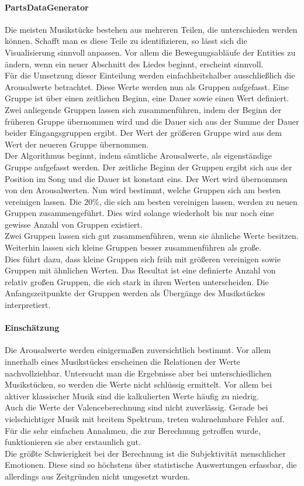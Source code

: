 \documentclass[11pt,a4paper]{article}
\begin{document}
\paragraph{PartsDataGenerator}
Die meisten Musikstücke bestehen aus mehreren Teilen, die unterschieden werden können. Schafft man es diese Teile zu identifizieren, so lässt sich die Visualisierung sinnvoll anpassen. Vor allem die Bewegungsabläufe der Entities zu ändern, wenn ein neuer Abschnitt des Liedes beginnt, erscheint sinnvoll.\\
Für die Umsetzung dieser Einteilung werden einfachheitshalber ausschließlich die Arousalwerte betrachtet. Diese Werte werden nun als Gruppen aufgefasst. Eine Gruppe ist über einen zeitlichen Beginn, eine Dauer sowie einen Wert definiert. Zwei anliegende Gruppen lassen sich zusammenführen, indem der Beginn der früheren Gruppe übernommen wird und die Dauer sich aus der Summe der Dauer beider Eingangsgruppen ergibt. Der Wert der größeren Gruppe wird aus dem Wert der neueren Gruppe übernommen.\\
Der Algorithmus beginnt, indem sämtliche Arousalwerte, als eigenständige Gruppe aufgefasst werden. Der zeitliche Beginn der Gruppen ergibt sich aus der Position im Song und die Dauer ist konstant eins. Der Wert wird übernommen von den Arousalwerten. Nun wird bestimmt, welche Gruppen sich am besten vereinigen lassen. Die $20\%$, die sich am besten vereinigen lassen, werden zu neuen Gruppen zusammengeführt. Dies wird solange wiederholt bis nur noch eine gewisse Anzahl von Gruppen existiert.\\
Zwei Gruppen lassen sich gut zusammenführen, wenn sie ähnliche Werte besitzen. Weiterhin lassen sich kleine Gruppen besser zusammenführen als große.\\
Dies führt dazu, dass kleine Gruppen sich früh mit größeren vereinigen sowie Gruppen mit ähnlichen Werten. Das Resultat ist eine definierte Anzahl von relativ großen Gruppen, die sich stark in ihren Werten unterscheiden. Die Anfangszeitpunkte der Gruppen werden als Übergänge des Musikstückes interpretiert.

\paragraph{Einschätzung}
Die Arousalwerte werden einigermaßen zuversichtlich bestimmt. Vor allem innerhalb eines Musikstückes erscheinen die Relationen der Werte nachvollziehbar. Untersucht man die Ergebnisse aber bei unterschiedlichen Musikstücken, so werden die Werte nicht schlüssig ermittelt. Vor allem bei aktiver klassischer Musik sind die kalkulierten Werte häufig zu niedrig.\\
Auch die Werte der Valenceberechnung sind nicht zuverlässig. Gerade bei vielschichtiger Musik mit breitem Spektrum, treten wahrnehmbare Fehler auf. Für die sehr einfachen Annahmen, die zur Berechnung getroffen wurde, funktionieren sie aber erstaunlich gut.\\
Die größte Schwierigkeit bei der Berechnung ist die Subjektivität menschlicher Emotionen. Diese sind so höchstens über statistische Auswertungen erfassbar, die allerdings aus Zeitgründen nicht umgesetzt wurden.
\end{document}
